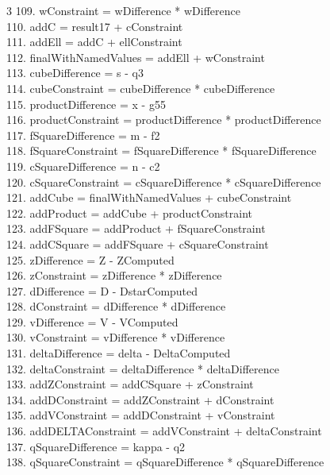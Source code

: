 \documentclass[10pt]{article}
\begin{document}
\begin{multicols}{3}
109. wConstraint = wDifference * wDifference\\
110. addC = result17 + cConstraint\\
111. addEll = addC + ellConstraint\\
112. finalWithNamedValues = addEll + wConstraint\\
113. cubeDifference = s - q3\\
114. cubeConstraint = cubeDifference * cubeDifference\\
115. productDifference = x - g55\\
116. productConstraint = productDifference * productDifference\\
117. fSquareDifference = m - f2\\
118. fSquareConstraint = fSquareDifference * fSquareDifference\\
119. cSquareDifference = n - c2\\
120. cSquareConstraint = cSquareDifference * cSquareDifference\\
121. addCube = finalWithNamedValues + cubeConstraint\\
122. addProduct = addCube + productConstraint\\
123. addFSquare = addProduct + fSquareConstraint\\
124. addCSquare = addFSquare + cSquareConstraint\\
125. zDifference = Z - ZComputed\\
126. zConstraint = zDifference * zDifference\\
127. dDifference = D - DstarComputed\\
128. dConstraint = dDifference * dDifference\\
129. vDifference = V - VComputed\\
130. vConstraint = vDifference * vDifference\\
131. deltaDifference = delta - DeltaComputed\\
132. deltaConstraint = deltaDifference * deltaDifference\\
133. addZConstraint = addCSquare + zConstraint\\
134. addDConstraint = addZConstraint + dConstraint\\
135. addVConstraint = addDConstraint + vConstraint\\
136. addDELTAConstraint = addVConstraint + deltaConstraint\\
137. qSquareDifference = kappa - q2\\
138. qSquareConstraint = qSquareDifference * qSquareDifference\\

\end{multicols}
\end{document}
